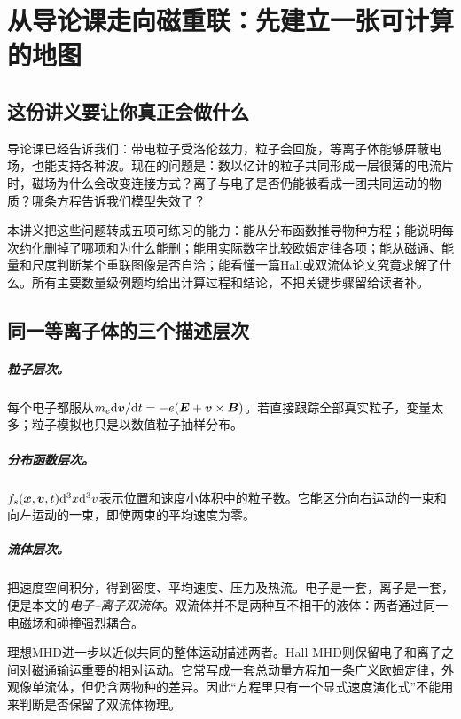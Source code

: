 \chapter{从导论课走向磁重联：先建立一张可计算的地图}
\label{hall:orientation}
\section{这份讲义要让你真正会做什么}
导论课已经告诉我们：带电粒子受洛伦兹力，粒子会回旋，等离子体能够屏蔽电场，也能支持各种波。现在的问题是：数以亿计的粒子共同形成一层很薄的电流片时，磁场为什么会改变连接方式？离子与电子是否仍能被看成一团共同运动的物质？哪条方程告诉我们模型失效了？

本讲义把这些问题转成五项可练习的能力：能从分布函数推导物种方程；能说明每次约化删掉了哪项和为什么能删；能用实际数字比较欧姆定律各项；能从磁通、能量和尺度判断某个重联图像是否自洽；能看懂一篇Hall或双流体论文究竟求解了什么。所有主要数量级例题均给出计算过程和结论，不把关键步骤留给读者补。


\section{同一等离子体的三个描述层次}
\paragraph{粒子层次。}每个电子都服从$m_e\mathrm d\bm{v}/\mathrm d t=-e(\bm{E}+\bm{v}\times\bm{B})$。若直接跟踪全部真实粒子，变量太多；粒子模拟也只是以数值粒子抽样分布。
\paragraph{分布函数层次。}$f_s(\bm{x},\bm{v},t)\mathrm d^3x\mathrm d^3v$表示位置和速度小体积中的粒子数。它能区分向右运动的一束和向左运动的一束，即使两束的平均速度为零。
\paragraph{流体层次。}把速度空间积分，得到密度、平均速度、压力及热流。电子是一套，离子是一套，便是本文的\emph{电子--离子双流体}。双流体并不是两种互不相干的液体：两者通过同一电磁场和碰撞强烈耦合。

理想MHD进一步以近似共同的整体运动描述两者。Hall MHD则保留电子和离子之间对磁通输运重要的相对运动。它常写成一套总动量方程加一条广义欧姆定律，外观像单流体，但仍含两物种的差异。因此“方程里只有一个显式速度演化式”不能用来判断是否保留了双流体物理。

